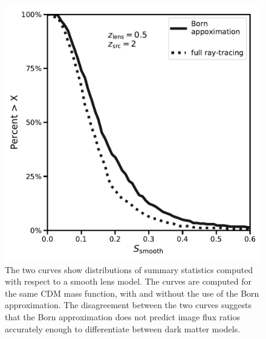 \begin{figure}
	\centering
	\includegraphics[clip,trim=0cm 0.5cm 0cm
	0cm,width=.6\textwidth,keepaspectratio]{./figures_LOSforward/test_born.pdf}
	\caption{\label{fig:bornfluxes} The two curves show distributions of summary statistics computed with respect to a smooth lens model. The curves are computed for the same CDM mass function, with and without the use of the Born approximation. The disagreement between the two curves suggests that the Born approximation does not predict image flux ratios accurately enough to differentiate between dark matter models.}
\end{figure}	

